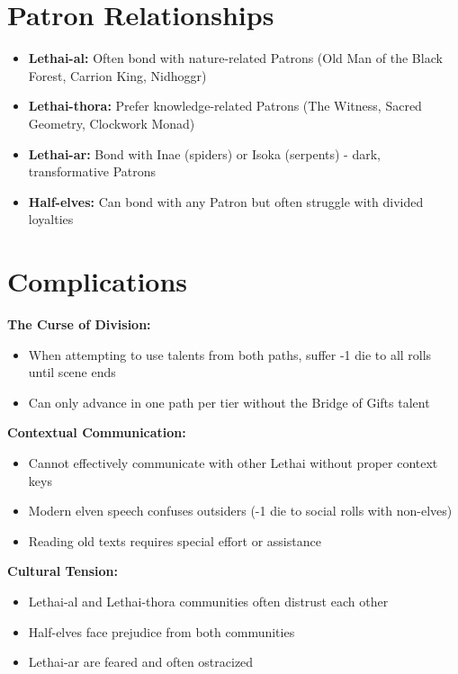 \documentclass[11pt]{article}
\newcommand{\complicationtype}[1]{\textbf{#1}}
\begin{document}
\section*{Patron Relationships}
\begin{itemize}
  \item \textbf{Lethai-al:} Often bond with nature-related Patrons (Old Man of the Black Forest, Carrion King, Nidhoggr)
  \item \textbf{Lethai-thora:} Prefer knowledge-related Patrons (The Witness, Sacred Geometry, Clockwork Monad)
  \item \textbf{Lethai-ar:} Bond with Inae (spiders) or Isoka (serpents) - dark, transformative Patrons
  \item \textbf{Half-elves:} Can bond with any Patron but often struggle with divided loyalties
\end{itemize}

\section*{Complications}
\complicationtype{The Curse of Division:}
\begin{itemize}
  \item When attempting to use talents from both paths, suffer -1 die to all rolls until scene ends
  \item Can only advance in one path per tier without the Bridge of Gifts talent
\end{itemize}

\complicationtype{Contextual Communication:}
\begin{itemize}
  \item Cannot effectively communicate with other Lethai without proper context keys
  \item Modern elven speech confuses outsiders (-1 die to social rolls with non-elves)
  \item Reading old texts requires special effort or assistance
\end{itemize}

\complicationtype{Cultural Tension:}
\begin{itemize}
  \item Lethai-al and Lethai-thora communities often distrust each other
  \item Half-elves face prejudice from both communities
  \item Lethai-ar are feared and often ostracized
\end{itemize}
\end{document}
